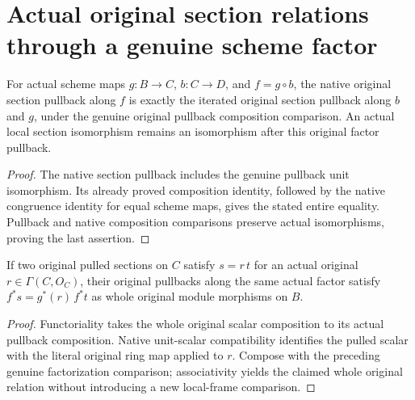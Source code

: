 \section{Actual original section relations through a genuine scheme factor}

\begin{theorem}
\label{thm:fc-line-section-factorization}
\leanok
{}
For actual scheme maps $g:B\to C$, $b:C\to D$, and
$f=g\circ b$, the native original section pullback along $f$
is exactly the iterated original section pullback along $b$ and
$g$, under the genuine original pullback composition comparison.
An actual local section isomorphism remains an isomorphism after
this original factor pullback.
\end{theorem}
\begin{proof}
The native section pullback includes the genuine pullback unit
isomorphism. Its already proved composition identity, followed by
the native congruence identity for equal scheme maps, gives the
stated entire equality. Pullback and native composition comparisons
preserve actual isomorphisms, proving the last assertion.
\end{proof}

\begin{theorem}
\label{thm:fc-line-section-factor-scalar-relation}
\leanok
{}
If two original pulled sections on $C$ satisfy
$s=r\,t$ for an actual original $r\in\Gamma(C,O_C)$, their
original pullbacks along the same actual factor satisfy
$f^*s=g^*(r)\,f^*t$ as whole original module morphisms on $B$.
\end{theorem}
\begin{proof}
Functoriality takes the whole original scalar composition to its
actual pullback composition. Native unit-scalar compatibility
identifies the pulled scalar with the literal original ring map
applied to $r$. Compose with the preceding genuine factorization
comparison; associativity yields the claimed whole original
relation without introducing a new local-frame comparison.
\end{proof}
